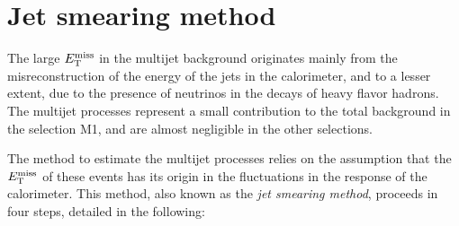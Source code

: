 \chapter{Jet smearing method}
    \label{app:JetSmearingMethod}

The large $E_{\mathrm{T}}^{\mathrm{miss}}$ in the multijet background originates mainly from the misreconstruction of the energy of the jets in the calorimeter, and to a lesser extent, due to the presence of neutrinos in the decays of heavy flavor hadrons.
The multijet processes represent a small contribution to the total background in the selection M1, and are almost negligible in the other selections.

The method to estimate the multijet processes relies on the assumption that the $E_{\mathrm{T}}^{\mathrm{miss}}$ of these events has its origin in the fluctuations in the response of the calorimeter.
This method, also known as the \emph{jet smearing method}, proceeds in four steps, detailed in the following:    

